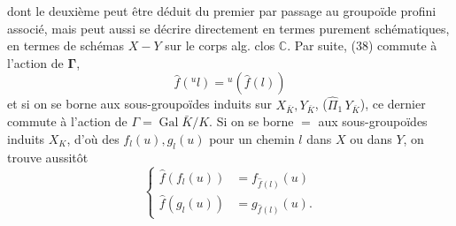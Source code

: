 dont le deuxième peut être déduit du premier par passage au groupoïde profini associé, mais peut aussi se décrire directement en termes purement schématiques, en termes  de schémas  $X\mathbin{-}Y$ sur le corps alg. clos $\mathbb C$. Par suite, (38) commute à l'action de $\mathbf{\Gamma}$,
\[
\tag{39}\widehat f({}^ul)={}^u(\widehat f(l))
\]
et si on se borne aux sous-groupoïdes induits sur $X_{\bar K},Y_{\bar K}$,  ($\widehat\Pi_1\,Y_{\bar K}$), ce dernier commute à l'action de $\Gamma=\operatorname{Gal}\bar K/K$. Si on se borne $=$ aux sous-groupoïdes induits $X_K$, d'où des $f_l(u),g_l(u)$ pour un chemin $l$ dans $X$ ou dans $Y$, on trouve aussitôt
\[
\tag{40}\left\{\begin{aligned}
\widehat f(f_l(u))&=f_{\widehat f(l)}(u)\\
\widehat f(g_l(u))&=g_{\widehat f(l)}(u).
\end{aligned}\right.
\]
